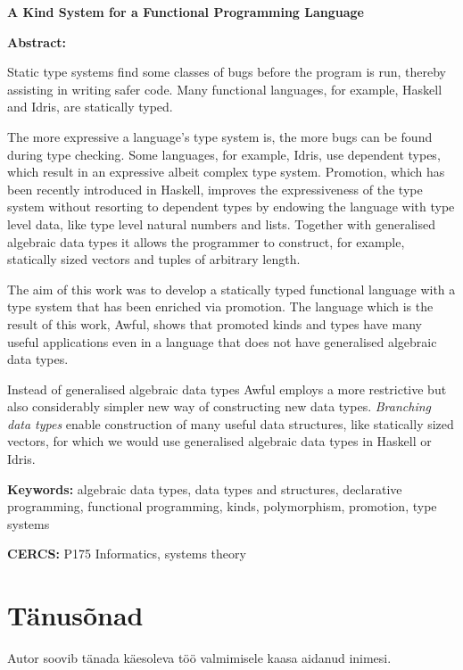 \documentclass[12pt]{article}
\newcommand\peatykktarn[1]{
  \clearpage
  \section*{#1}
  \addcontentsline{toc}{section}{#1}}
\begin{document}
  {
    \noindent
    \textbf{\large A Kind System for a Functional Programming Language}

    \vspace*{1ex}

    \noindent
    \textbf{Abstract:}

    \noindent
    Static type systems find some classes of bugs before the program is run, thereby assisting in writing safer code. Many functional languages, for example, Haskell and Idris, are statically typed.

    The more expressive a language's type system is, the more bugs can be found during type checking. Some languages, for example, Idris, use dependent types, which result in an expressive albeit complex type system. Promotion, which has been recently introduced in Haskell, improves the expressiveness of the type system without resorting to dependent types by endowing the language with type level data, like type level natural numbers and lists. Together with generalised algebraic data types it allows the programmer to construct, for example, statically sized vectors and tuples of arbitrary length.

    The aim of this work was to develop a statically typed functional language with a type system that has been enriched via promotion. The language which is the result of this work, Awful, shows that promoted kinds and types have many useful applications even in a language that does not have generalised algebraic data types.

    Instead of generalised algebraic data types Awful employs a more restrictive but also considerably simpler new way of constructing new data types. \textit{Branching data types} enable construction of many useful data structures, like statically sized vectors, for which we would use generalised algebraic data types in Haskell or Idris.

    \vspace*{1ex}

    \noindent
    \textbf{Keywords:} algebraic data types, data types and structures, declarative programming, functional programming, kinds, polymorphism, promotion, type systems

    \vspace*{1ex}

    \noindent
    \textbf{CERCS:} P175 Informatics, systems theory

    \vspace*{1ex}}
  \newpage
  \tableofcontents
  \peatykktarn{Tänusõnad}
    Autor soovib tänada käesoleva töö valmimisele kaasa aidanud inimesi.
\end{document}
